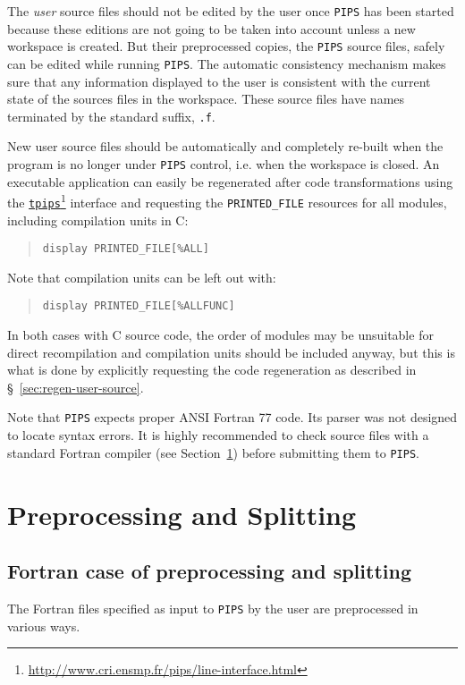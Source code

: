 \documentclass[a4paper]{report}
\newcommand{\LINK}[2]{\href{#2}{#1}\footnote{\url{#2}}\xspace}
\newcommand{\Pips}{\texttt{PIPS}}
\newcommand{\TPIPS}{\LINK{\texttt{tpips}}{http://www.cri.ensmp.fr/pips/line-interface.html}}
\begin{document}
The {\em user} source files should not be edited by the user once \Pips{}
has been started because these editions are not going to be taken into
account unless a new workspace is created.
But their preprocessed copies, the
\Pips{} source files, safely can be edited while running \Pips{}. The
automatic consistency mechanism makes sure that any information
displayed to the user is consistent with the current state of the
sources files in the workspace. These source files have names terminated
by the standard suffix, {\tt .f}.

New user source files should be automatically and completely re-built when the program
is no longer under \Pips{} control, i.e. when the
workspace is closed. An executable application can easily be regenerated
after code transformations using the \TPIPS{} interface and requesting the
{\tt PRINTED\_FILE} resources for all modules, including compilation units in C:
\begin{quote}
{\tt display PRINTED\_FILE[\%ALL]}
\end{quote}
Note that compilation units can be left out with:
\begin{quote}
{\tt display PRINTED\_FILE[\%ALLFUNC]}
\end{quote}
In both cases with C source code, the order of modules may be unsuitable
for direct recompilation and compilation units should be included anyway,
but this is what is done by explicitly requesting the code regeneration as
described in \S~\ref{sec:regen-user-source}.

Note that \Pips{} expects proper ANSI Fortran 77 code. Its parser was not
designed to locate syntax errors. It is highly recommended to check source
files with a standard Fortran compiler (see
Section~\ref{subsection-preprocessing-and-splitting}) before submitting them to
\Pips{}.


\section{Preprocessing and Splitting}
\label{subsection-preprocessing-and-splitting}

\subsection{Fortran case of preprocessing and splitting}
\label{sec:fortran-case}


The Fortran files specified as input to \Pips{} by the user are
preprocessed in various ways.
\end{document}
